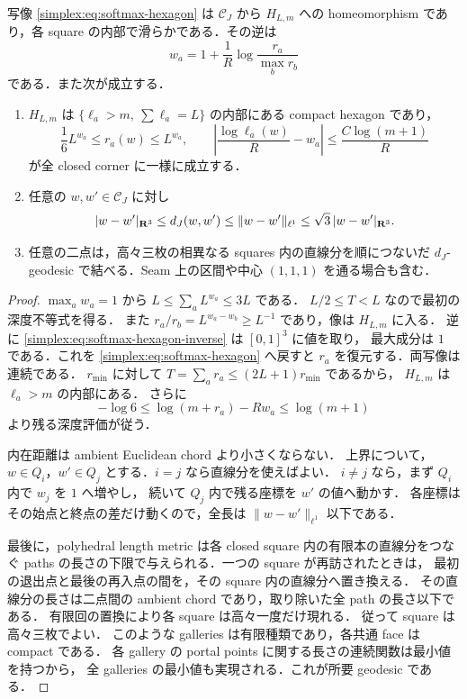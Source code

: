 \begin{lemma}
\label{simplex:lem:closed-corner-parameter}
写像 \eqref{simplex:eq:softmax-hexagon} は $\mathcal C_J$ から $H_{L,m}$ への
homeomorphism であり，各 square の内部で滑らかである．その逆は
\begin{equation}\label{simplex:eq:softmax-hexagon-inverse}
 w_a=1+\frac1R\log\frac{r_a}{\max_b r_b}
\end{equation}
である．また次が成立する．
\begin{enumerate}[label=\textup{(H\arabic*)}]
\item $H_{L,m}$ は $\{\ell_a>m,\ \sum\ell_a=L\}$ の内部にある compact hexagon であり，
\begin{equation}\label{simplex:eq:softmax-depth-bounds}
 \frac16 L^{w_a}\le r_a(w)\le L^{w_a},
 \qquad
 \left|\frac{\log\ell_a(w)}R-w_a\right|
       \le \frac{C\log(m+1)}R
\end{equation}
が全 closed corner に一様に成立する．
\item 任意の $w,w'\in\mathcal C_J$ に対し
\begin{equation}\label{simplex:eq:corner-chord-comparison}
 |w-w'|_{\mathbf R^3}\le d_J(w,w')
       \le\|w-w'\|_{\ell^1}\le\sqrt3\,|w-w'|_{\mathbf R^3}.
\end{equation}
\item 任意の二点は，高々三枚の相異なる squares 内の直線分を順につないだ
$d_J$-geodesic で結べる．Seam 上の区間や中心 $(1,1,1)$ を通る場合も含む．
\end{enumerate}
\end{lemma}

\begin{proof}
$\max_a w_a=1$ から $L\le\sum_aL^{w_a}\le3L$ である．
$L/2\le T<L$ なので最初の深度不等式を得る．
また $r_a/r_b=L^{w_a-w_b}\ge L^{-1}$ であり，像は $H_{L,m}$ に入る．
逆に \eqref{simplex:eq:softmax-hexagon-inverse} は $[0,1]^3$ に値を取り，
最大成分は $1$ である．これを \eqref{simplex:eq:softmax-hexagon} へ戻すと
$r_a$ を復元する．両写像は連続である．
$r_{\min}$ に対して $T=\sum_a r_a\le(2L+1)r_{\min}$ であるから，
$H_{L,m}$ は $\ell_a>m$ の内部にある．
さらに
\[
 -\log6\le \log(m+r_a)-Rw_a\le\log(m+1)
\]
より残る深度評価が従う．

内在距離は ambient Euclidean chord より小さくならない．
上界について，$w\in Q_i$，$w'\in Q_j$ とする．$i=j$ なら直線分を使えばよい．
$i\ne j$ なら，まず $Q_i$ 内で $w_j$ を $1$ へ増やし，
続いて $Q_j$ 内で残る座標を $w'$ の値へ動かす．
各座標はその始点と終点の差だけ動くので，全長は $\|w-w'\|_{\ell^1}$ 以下である．

最後に，polyhedral length metric は各 closed square 内の有限本の直線分をつなぐ
paths の長さの下限で与えられる．一つの square が再訪されたときは，
最初の退出点と最後の再入点の間を，その square 内の直線分へ置き換える．
その直線分の長さは二点間の ambient chord であり，取り除いた全 path の長さ以下である．
有限回の置換により各 square は高々一度だけ現れる．
従って square は高々三枚でよい．
このような galleries は有限種類であり，各共通 face は compact である．
各 gallery の portal points に関する長さの連続関数は最小値を持つから，
全 galleries の最小値も実現される．これが所要 geodesic である．
\end{proof}

